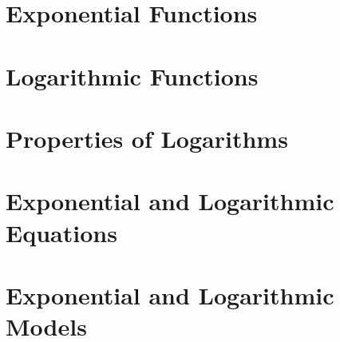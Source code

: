 

\section{Exponential Functions}

\section{Logarithmic Functions}

\section{Properties of Logarithms}

\section{Exponential and Logarithmic Equations}

\section{Exponential and Logarithmic Models}









